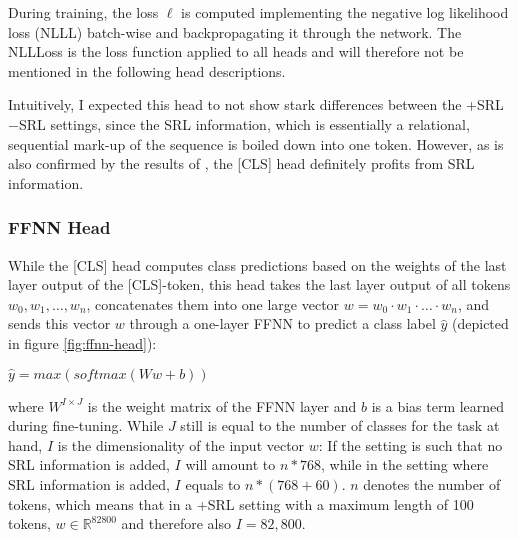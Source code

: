 During training, the loss $\ell $ is computed implementing the negative log likelihood loss
(NLLL) batch-wise and
backpropagating it through the network. The NLLLoss is the loss function applied to all
heads and will therefore not be mentioned in the following head descriptions.

Intuitively, I expected this head to not show stark differences between the +SRL $-$SRL settings,
since the SRL information, which is essentially a relational, sequential mark-up of the sequence is
boiled down into one token. However, as is also confirmed by the results of \cite{zhang2019semantics},
the [CLS] head definitely profits from SRL information.


\subsubsection{FFNN Head}


While the [CLS] head computes class predictions based on the weights of the last layer
output of the [CLS]-token, this head takes the last layer output of all tokens $w_0,
w_1, \dotso , w_n$, concatenates them into one large vector $w = w_0\cdot w_1\cdot \dotso
\cdot w_n$, and sends this vector $w$ through a one-layer FFNN to predict a class label
$\hat{y}$ (depicted in figure \ref{fig:ffnn-head}):

$\hat{y} = max(softmax(Ww+b))$

where $W^{I\times J}$ is the weight matrix of the FFNN layer and $b$ is a bias term learned during
fine-tuning. While $J$ still is equal to the number of classes for the task at hand, $I$ is the
dimensionality of the input vector $w$: If the setting is such that no SRL information is added,
$I$ will amount to $n * 768$, while in the setting where SRL information is added, $I$ equals to $n
* (768+60)$. $n$ denotes the number of tokens, which means that in a +SRL setting with a maximum
length of 100 tokens, $w \in \mathbb{R}^{82800}$ and therefore also $I = 82,800$.

